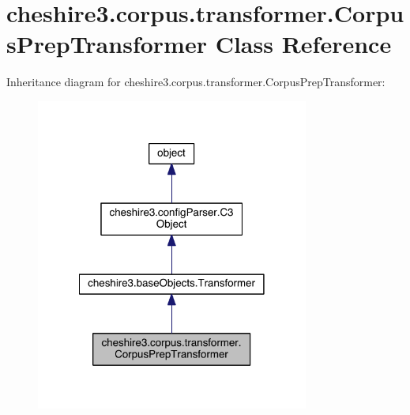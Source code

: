 \hypertarget{classcheshire3_1_1corpus_1_1transformer_1_1_corpus_prep_transformer}{\section{cheshire3.\-corpus.\-transformer.\-Corpus\-Prep\-Transformer Class Reference}
\label{classcheshire3_1_1corpus_1_1transformer_1_1_corpus_prep_transformer}
}


Inheritance diagram for cheshire3.\-corpus.\-transformer.\-Corpus\-Prep\-Transformer\-:
\nopagebreak
\begin{figure}[H]
\begin{center}
\leavevmode
\includegraphics[width=254pt]{classcheshire3_1_1corpus_1_1transformer_1_1_corpus_prep_transformer__inherit__graph}
\end{center}
\end{figure}


